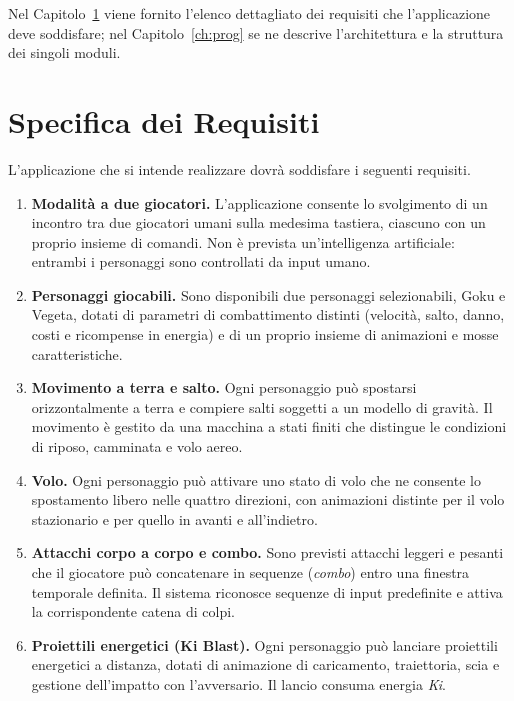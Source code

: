 \documentclass[12pt,a4paper]{report}
\begin{document}
Nel Capitolo~\ref{ch:spereq} viene fornito l'elenco dettagliato dei requisiti che l'applicazione deve soddisfare; nel Capitolo~\ref{ch:prog} se ne descrive l'architettura e la struttura dei singoli moduli.
\chapter{Specifica dei Requisiti}\label{ch:spereq}

L'applicazione che si intende realizzare dovrà soddisfare i seguenti requisiti.

\begin{enumerate}

  \item \textbf{Modalità a due giocatori.} L'applicazione consente lo svolgimento di un incontro tra due giocatori umani sulla medesima tastiera, ciascuno con un proprio insieme di comandi. Non è prevista un'intelligenza artificiale: entrambi i personaggi sono controllati da input umano.

  \item \textbf{Personaggi giocabili.} Sono disponibili due personaggi selezionabili, Goku e Vegeta, dotati di parametri di combattimento distinti (velocità, salto, danno, costi e ricompense in energia) e di un proprio insieme di animazioni e mosse caratteristiche.

  \item \textbf{Movimento a terra e salto.} Ogni personaggio può spostarsi orizzontalmente a terra e compiere salti soggetti a un modello di gravità. Il movimento è gestito da una macchina a stati finiti che distingue le condizioni di riposo, camminata e volo aereo.

  \item \textbf{Volo.} Ogni personaggio può attivare uno stato di volo che ne consente lo spostamento libero nelle quattro direzioni, con animazioni distinte per il volo stazionario e per quello in avanti e all'indietro.

  \item \textbf{Attacchi corpo a corpo e combo.} Sono previsti attacchi leggeri e pesanti che il giocatore può concatenare in sequenze (\emph{combo}) entro una finestra temporale definita. Il sistema riconosce sequenze di input predefinite e attiva la corrispondente catena di colpi.

  \item \textbf{Proiettili energetici (Ki Blast).} Ogni personaggio può lanciare proiettili energetici a distanza, dotati di animazione di caricamento, traiettoria, scia e gestione dell'impatto con l'avversario. Il lancio consuma energia \emph{Ki}.


\end{enumerate}
\end{document}
